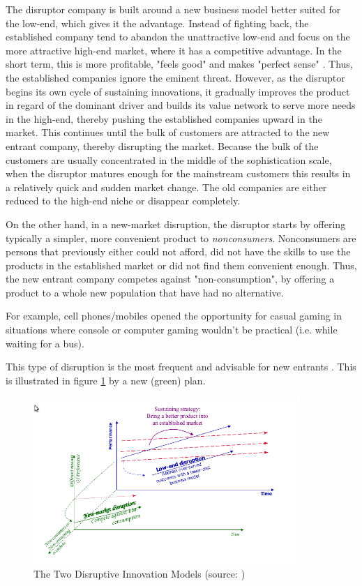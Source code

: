 \documentclass[a4paper,10pt]{article}
\begin{document}
The disruptor company is built around a new business model better suited for the low-end, which gives it the advantage.  
Instead of fighting back, the established company tend to abandon the unattractive low-end and focus on the more attractive high-end market, where it has
a competitive advantage. In the short term, this is more profitable, "feels good" and makes "perfect sense" \cite{innovatorsSolution}. 
Thus, the established companies ignore the eminent threat. 
However, as the disruptor begins its own cycle of sustaining innovations, it gradually improves the product in regard of the dominant driver 
and builds its value network to serve more needs in the high-end, 
thereby pushing the established companies upward in the market. 
This continues until the bulk of customers are 
attracted to the new entrant company, thereby disrupting the market. Because the bulk of the customers are usually concentrated in the 
middle of the sophistication scale, when the disruptor matures enough for the mainstream customers this results in a relatively 
quick and sudden market change. The old companies are either reduced to the high-end niche or disappear completely.


On the other hand, in a new-market disruption, the disruptor starts by offering 
typically a simpler, more convenient product to \emph{nonconsumers}.
Nonconsumers are persons that previously either could not afford, did not have the skills to use the products in the established 
market or did not find them convenient enough.
Thus, the new entrant company competes against "non-consumption", by offering a product to a whole new population that have had no alternative. 

For example, cell phones/mobiles opened the opportunity for casual gaming in situations where console or computer gaming wouldn't be practical 
(i.e. while waiting for a bus).

This type of disruption is the most frequent \cite{disruptionInEducation} and advisable for new entrants \cite{DisruptingClassExpandedEdition}. 
This is illustrated in figure \ref{fig:twoDisruptiveInnovationModels} by a new (green) plan.

\begin{figure}[here]
\includegraphics[width=0.9\textwidth]{images/twoDiruptiveInnovationModels.png}
 \caption{The Two Disruptive Innovation Models (source: \cite{innovatorsSolution})}
\label{fig:twoDisruptiveInnovationModels}
\end{figure}
\end{document}
